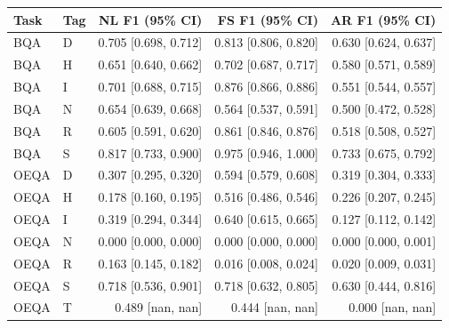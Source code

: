\begin{tabular}{llrrr}
\toprule
Task & Tag & NL F1 (95\% CI) & FS F1 (95\% CI) & AR F1 (95\% CI) \\
\midrule
BQA & D & 0.705 [0.698, 0.712] & 0.813 [0.806, 0.820] & 0.630 [0.624, 0.637] \\
BQA & H & 0.651 [0.640, 0.662] & 0.702 [0.687, 0.717] & 0.580 [0.571, 0.589] \\
BQA & I & 0.701 [0.688, 0.715] & 0.876 [0.866, 0.886] & 0.551 [0.544, 0.557] \\
BQA & N & 0.654 [0.639, 0.668] & 0.564 [0.537, 0.591] & 0.500 [0.472, 0.528] \\
BQA & R & 0.605 [0.591, 0.620] & 0.861 [0.846, 0.876] & 0.518 [0.508, 0.527] \\
BQA & S & 0.817 [0.733, 0.900] & 0.975 [0.946, 1.000] & 0.733 [0.675, 0.792] \\
OEQA & D & 0.307 [0.295, 0.320] & 0.594 [0.579, 0.608] & 0.319 [0.304, 0.333] \\
OEQA & H & 0.178 [0.160, 0.195] & 0.516 [0.486, 0.546] & 0.226 [0.207, 0.245] \\
OEQA & I & 0.319 [0.294, 0.344] & 0.640 [0.615, 0.665] & 0.127 [0.112, 0.142] \\
OEQA & N & 0.000 [0.000, 0.000] & 0.000 [0.000, 0.000] & 0.000 [0.000, 0.001] \\
OEQA & R & 0.163 [0.145, 0.182] & 0.016 [0.008, 0.024] & 0.020 [0.009, 0.031] \\
OEQA & S & 0.718 [0.536, 0.901] & 0.718 [0.632, 0.805] & 0.630 [0.444, 0.816] \\
OEQA & T & 0.489 [nan, nan] & 0.444 [nan, nan] & 0.000 [nan, nan] \\
\bottomrule
\end{tabular}
